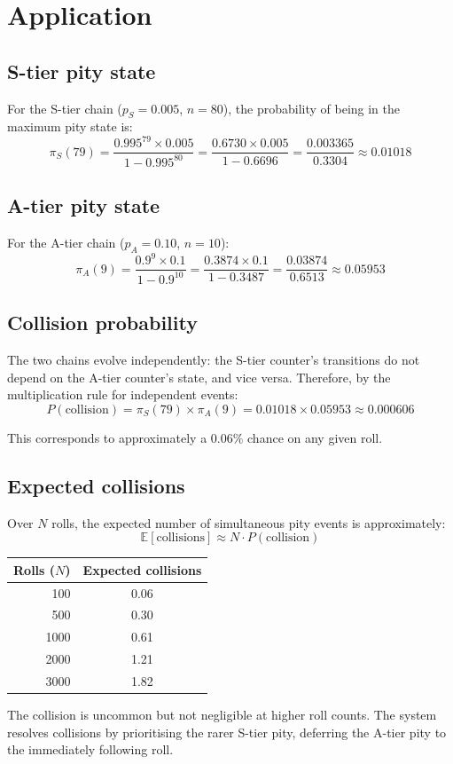 \documentclass[11pt,a4paper]{article}
\begin{document}
\section{Application}

\subsection{S-tier pity state}

For the S-tier chain ($p_S = 0.005$, $n = 80$), the probability of being in the maximum pity state is:
\[
\pi_S(79) = \frac{0.995^{79} \times 0.005}{1 - 0.995^{80}} = \frac{0.6730 \times 0.005}{1 - 0.6696} = \frac{0.003365}{0.3304} \approx 0.01018
\]

\subsection{A-tier pity state}

For the A-tier chain ($p_A = 0.10$, $n = 10$):
\[
\pi_A(9) = \frac{0.9^{9} \times 0.1}{1 - 0.9^{10}} = \frac{0.3874 \times 0.1}{1 - 0.3487} = \frac{0.03874}{0.6513} \approx 0.05953
\]

\subsection{Collision probability}

The two chains evolve independently: the S-tier counter's transitions do not depend on the A-tier counter's state, and vice versa. Therefore, by the multiplication rule for independent events:
\[
\boxed{P(\text{collision}) = \pi_S(79) \times \pi_A(9) = 0.01018 \times 0.05953 \approx 0.000606}
\]

This corresponds to approximately a $0.06\%$ chance on any given roll.

\subsection{Expected collisions}

Over $N$ rolls, the expected number of simultaneous pity events is approximately:
\[
\mathbb{E}[\text{collisions}] \approx N \cdot P(\text{collision})
\]

\begin{table}[h]
\centering
\begin{tabular}{@{}rc@{}}
\toprule
Rolls ($N$) & Expected collisions \\
\midrule
100   & 0.06 \\
500   & 0.30 \\
1000  & 0.61 \\
2000  & 1.21 \\
3000  & 1.82 \\
\bottomrule
\end{tabular}
\end{table}

The collision is uncommon but not negligible at higher roll counts. The system resolves collisions by prioritising the rarer S-tier pity, deferring the A-tier pity to the immediately following roll.
\end{document}
